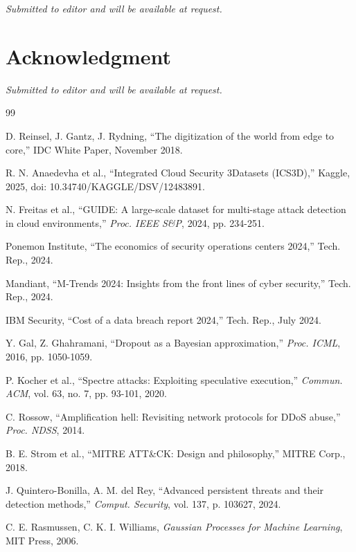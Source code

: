 \documentclass[review,12pt]{elsarticle}
\begin{document}
\textit{Submitted to editor and will be available at request.}

\section*{Acknowledgment}

\textit{Submitted to editor and will be available at request.}


\begin{thebibliography}{99}

D. Reinsel, J. Gantz, J. Rydning, ``The digitization of the world from edge to core,'' IDC White Paper, November 2018.

R. N. Anaedevha et al., ``Integrated Cloud Security 3Datasets (ICS3D),'' Kaggle, 2025, doi: 10.34740/KAGGLE/DSV/12483891.

N. Freitas et al., ``GUIDE: A large-scale dataset for multi-stage attack detection in cloud environments,'' \textit{Proc. IEEE S\&P}, 2024, pp. 234-251.

Ponemon Institute, ``The economics of security operations centers 2024,'' Tech. Rep., 2024.

Mandiant, ``M-Trends 2024: Insights from the front lines of cyber security,'' Tech. Rep., 2024.

IBM Security, ``Cost of a data breach report 2024,'' Tech. Rep., July 2024.

Y. Gal, Z. Ghahramani, ``Dropout as a Bayesian approximation,'' \textit{Proc. ICML}, 2016, pp. 1050-1059.

P. Kocher et al., ``Spectre attacks: Exploiting speculative execution,'' \textit{Commun. ACM}, vol. 63, no. 7, pp. 93-101, 2020.

C. Rossow, ``Amplification hell: Revisiting network protocols for DDoS abuse,'' \textit{Proc. NDSS}, 2014.

B. E. Strom et al., ``MITRE ATT\&CK: Design and philosophy,'' MITRE Corp., 2018.

J. Quintero-Bonilla, A. M. del Rey, ``Advanced persistent threats and their detection methods,'' \textit{Comput. Security}, vol. 137, p. 103627, 2024.

C. E. Rasmussen, C. K. I. Williams, \textit{Gaussian Processes for Machine Learning}, MIT Press, 2006.


\end{thebibliography}
\end{document}
